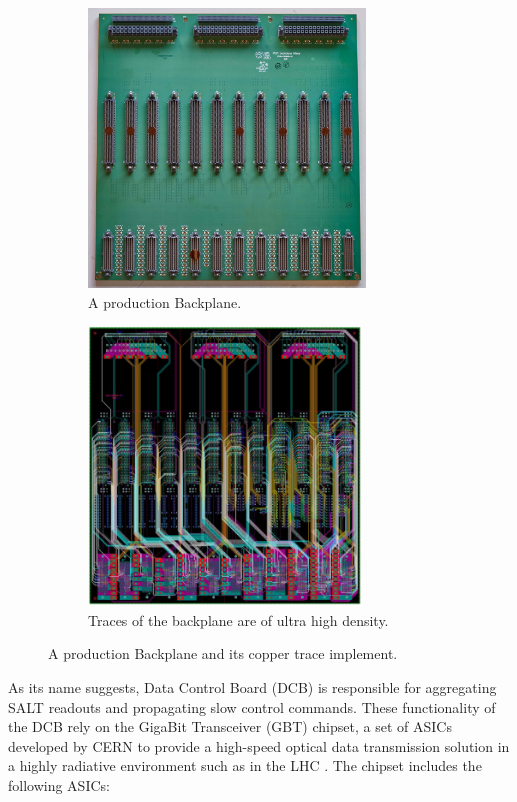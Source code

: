 \begin{figure}[!htb]
    \centering
    \begin{subfigure}[t]{0.48\textwidth}
        \centering
        \includegraphics[height=20em]{./figs-ut-upgrade/backplane/backplane_compressed.jpg}
        \caption{
            A production Backplane.
        }
    \end{subfigure}
    \hspace{10pt}
    \begin{subfigure}[t]{0.48\textwidth}
        \centering
        \includegraphics[height=20em]{./figs-ut-upgrade/backplane/backplane_trace.pdf}
        \caption{
            Traces of the backplane are of ultra high density.
        }
    \end{subfigure}

    \caption{
        A production Backplane and its copper trace implement.
    }
    \label{fig:backplane}
\end{figure}

As its name suggests, Data Control Board (DCB) is responsible for aggregating
SALT readouts and propagating slow control commands.
These functionality of the DCB rely on the GigaBit Transceiver (GBT)
chipset, a set of ASICs developed by CERN to provide a high-speed optical data
transmission solution in a highly radiative environment such as in the LHC
\cite{P_Moreira_2010}.
The chipset includes the following ASICs:

